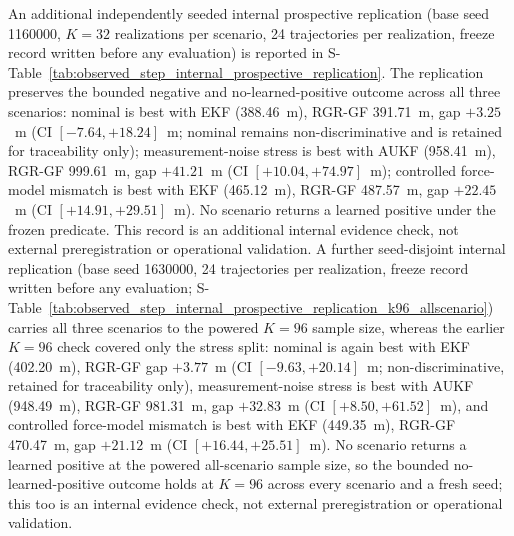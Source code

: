 \documentclass{article}
\begin{document}
An additional independently seeded internal prospective replication (base seed 1160000, $K=32$ realizations per scenario, 24 trajectories per realization, freeze record written before any evaluation) is reported in S-Table~\ref{tab:observed_step_internal_prospective_replication}. The replication preserves the bounded negative and no-learned-positive outcome across all three scenarios: nominal is best with EKF (388.46~m), RGR-GF 391.71~m, gap \(+3.25\)~m (CI \([-7.64,+18.24]\)~m; nominal remains non-discriminative and is retained for traceability only); measurement-noise stress is best with AUKF (958.41~m), RGR-GF 999.61~m, gap \(+41.21\)~m (CI \([+10.04,+74.97]\)~m); controlled force-model mismatch is best with EKF (465.12~m), RGR-GF 487.57~m, gap \(+22.45\)~m (CI \([+14.91,+29.51]\)~m). No scenario returns a learned positive under the frozen predicate. This record is an additional internal evidence check, not external preregistration or operational validation. A further seed-disjoint internal replication (base seed 1630000, 24 trajectories per realization, freeze record written before any evaluation; S-Table~\ref{tab:observed_step_internal_prospective_replication_k96_allscenario}) carries all three scenarios to the powered $K=96$ sample size, whereas the earlier $K=96$ check covered only the stress split: nominal is again best with EKF (402.20~m), RGR-GF gap \(+3.77\)~m (CI \([-9.63,+20.14]\)~m; non-discriminative, retained for traceability only), measurement-noise stress is best with AUKF (948.49~m), RGR-GF 981.31~m, gap \(+32.83\)~m (CI \([+8.50,+61.52]\)~m), and controlled force-model mismatch is best with EKF (449.35~m), RGR-GF 470.47~m, gap \(+21.12\)~m (CI \([+16.44,+25.51]\)~m). No scenario returns a learned positive at the powered all-scenario sample size, so the bounded no-learned-positive outcome holds at $K=96$ across every scenario and a fresh seed; this too is an internal evidence check, not external preregistration or operational validation.
\end{document}
